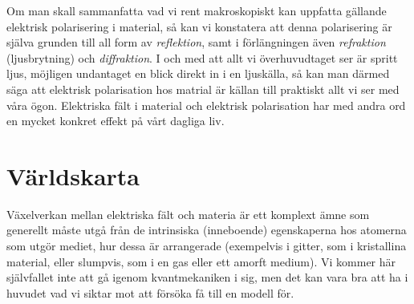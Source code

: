 Om man skall sammanfatta vad vi rent makroskopiskt kan uppfatta g{\"a}llande
elektrisk polarisering i material, s{\aa} kan vi konstatera att denna
polarisering {\"a}r sj{\"a}lva grunden till all form av {\it reflektion},
samt i f{\"o}rl{\"a}ngningen {\"a}ven {\it refraktion} (ljusbrytning) och
{\it diffraktion}.
I och med att allt vi {\"o}verhuvudtaget ser {\"a}r spritt ljus, m{\"o}jligen
undantaget en blick direkt in i en ljusk{\"a}lla, s{\aa} kan man d{\"a}rmed
s{\"a}ga att elektrisk polarisation hos matrial {\"a}r k{\"a}llan till praktiskt
allt vi ser med v{\aa}ra {\"o}gon. Elektriska f{\"a}lt i material och elektrisk
polarisation har med andra ord en mycket konkret effekt p{\aa} v{\aa}rt dagliga
liv.

\section{V{\"a}rldskarta}
V{\"a}xelverkan mellan elektriska f{\"a}lt och materia {\"a}r ett komplext
{\"a}mne som generellt m{\aa}ste utg{\aa} fr{\aa}n de intrinsiska (inneboende)
egenskaperna hos atomerna som utg{\"o}r mediet, hur dessa {\"a}r arrangerade
(exempelvis i gitter, som i kristallina material, eller slumpvis, som i en gas
eller ett amorft medium).
Vi kommer h{\"a}r sj{\"a}lvfallet inte att g{\aa} igenom kvantmekaniken i sig,
men det kan vara bra att ha i huvudet vad vi siktar mot att f{\"o}rs{\"o}ka
f{\aa} till en modell f{\"o}r.


